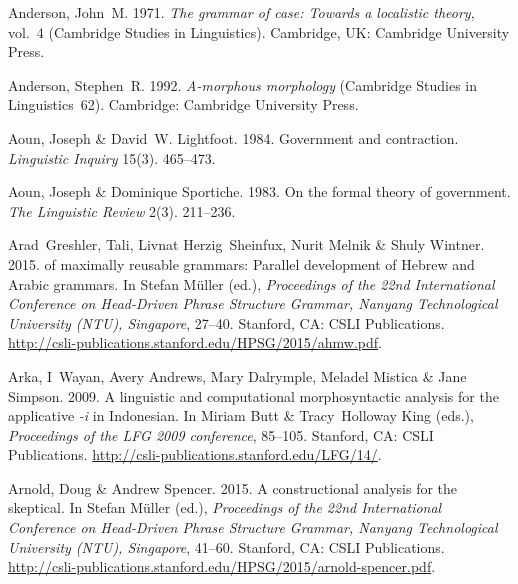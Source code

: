 \begin{thebibliography}{1420}
Anderson, John~M. 1971.
\newblock \emph{The grammar of case: {Towards} a localistic theory}, vol.~4
  (Cambridge Studies in Linguistics).
\newblock Cambridge, UK: Cambridge University Press.

Anderson, Stephen~R. 1992.
\newblock \emph{A-morphous morphology} (Cambridge Studies in Linguistics~62).
\newblock Cambridge: Cambridge University Press.

Aoun, Joseph \& David~W. Lightfoot. 1984.
\newblock Government and contraction.
\newblock \emph{Linguistic Inquiry} 15(3). 465--473.

Aoun, Joseph \& Dominique Sportiche. 1983.
\newblock On the formal theory of government.
\newblock \emph{The Linguistic Review} 2(3). 211--236.

Arad~Greshler, Tali, Livnat Herzig~Sheinfux, Nurit Melnik \& Shuly Wintner.
  2015.
 of maximally reusable grammars: {Parallel} development
  of {Hebrew} and {Arabic} grammars.
\newblock In Stefan M{\"u}ller (ed.), \emph{Proceedings of the {22nd
  International Conference on Head-Driven Phrase Structure Grammar, Nanyang
  Technological University (NTU), Singapore}}, 27--40. Stanford, CA: CSLI
  Publications.
\newblock
  \urlprefix\url{http://csli-publications.stanford.edu/HPSG/2015/ahmw.pdf}.

Arka, I~Wayan, Avery Andrews, Mary Dalrymple, Meladel Mistica \& Jane Simpson.
  2009.
\newblock A linguistic and computational morphosyntactic analysis for the
  applicative \emph{-i} in {Indonesian}.
\newblock In Miriam Butt \& Tracy~Holloway King (eds.), \emph{Proceedings of
  the {LFG 2009} conference}, 85--105. Stanford, CA: CSLI Publications.
\newblock \urlprefix\url{http://csli-publications.stanford.edu/LFG/14/}.

Arnold, Doug \& Andrew Spencer. 2015.
\newblock A constructional analysis for the skeptical.
\newblock In Stefan M{\"u}ller (ed.), \emph{Proceedings of the {22nd
  International Conference on Head-Driven Phrase Structure Grammar, Nanyang
  Technological University (NTU), Singapore}}, 41--60. Stanford, CA: CSLI
  Publications.
\newblock
  \urlprefix\url{http://csli-publications.stanford.edu/HPSG/2015/arnold-spencer.pdf}.


\end{thebibliography}

